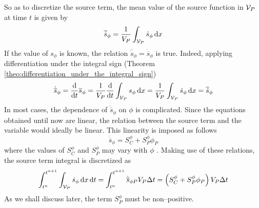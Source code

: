 So as to discretize the source term, the mean value of the source function in
$\mathcal{V}_{P}$ at time $t$ is given by
\begin{equation*}
	\overline{\dot{s}}_\phi = 
	\frac{1}{V_P} \int_{\mathcal{V}_{P}} \dot{s}_\phi \dd{x}
\end{equation*}
If the value of $s_\phi$ is known, the relation $\overline{\dot{s}}_\phi =
\dot{\overline{s}}_\phi$ is true. Indeed, applying differentiation under the
integral sign (Theorem \ref{theo:differentiation_under_the_integral_sign})
\begin{equation*}
	\dot{\overline{s}}_\phi = 
	\frac{\dd}{\dd{t}} \overline{s}_\phi = 
	\frac{1}{V_P} \frac{\dd}{\dd{t}} \int_{\mathcal{V}_{P}} s_\phi \dd{x} = 
	\frac{1}{V_P} \int_{\mathcal{V}_{P}} \dot{s}_\phi \dd{x} = 
	\overline{\dot{s}}_\phi
\end{equation*}
In most cases, the dependence of $\dot{\overline{s}}_\phi$ on $\phi$ is
complicated. Since the equations obtained until now are linear, the relation
between the source term and the variable would ideally be linear. This linearity
is imposed as follows
\begin{equation*}
	\dot{\overline{s}}_\phi = S_C^\phi + S_P^\phi \phi_P
\end{equation*}
where the values of $S_C^\phi$ and $S_P^\phi$ may vary with $\phi$
\cite{patankar2008numerical}. Making use of these relations, the source term
integral is discretized as
\begin{equation*}
	\int_{t^n}^{t^{n+1}} \int_{\mathcal{V}_{P}} \dot{s}_\phi \dd{x} \dd{t} = 
	\int_{t^n}^{t^{n+1}} 
	\dot{\overline{s}}_{\phi P} V_P \Delta t = 
	\left( S_C^\phi + S_P^\phi \phi_P \right) V_P \Delta t
\end{equation*}
As we shall discuss later, the term $S_P^\phi$ must be non--positive.

